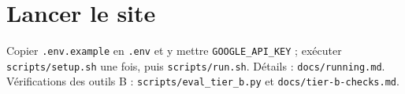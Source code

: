 \documentclass[11pt,a4paper]{article}
\begin{document}
\section{Lancer le site}
Copier \texttt{.env.example} en \texttt{.env} et y mettre \texttt{GOOGLE\_API\_KEY} ; exécuter \texttt{scripts/setup.sh} une fois, puis \texttt{scripts/run.sh}. Détails : \texttt{docs/running.md}. Vérifications des outils B : \texttt{scripts/eval\_tier\_b.py} et \texttt{docs/tier-b-checks.md}.
\end{document}
